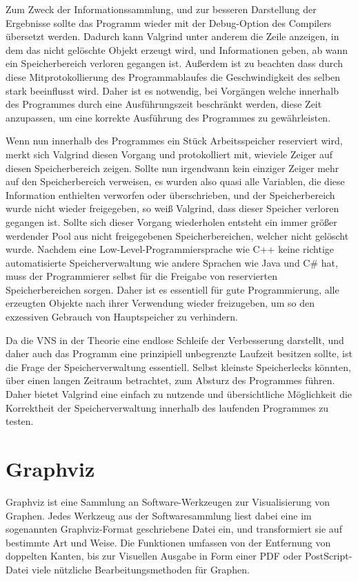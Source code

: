 Zum Zweck der Informationssammlung, und zur besseren Darstellung der Ergebnisse sollte das Programm wieder mit der Debug-Option des Compilers übersetzt werden. Dadurch kann Valgrind unter anderem die Zeile
anzeigen, in dem das nicht gelöschte Objekt erzeugt wird, und Informationen geben, ab wann ein Speicherbereich verloren gegangen ist. Außerdem ist zu beachten dass durch diese Mitprotokollierung des 
Programmablaufes die Geschwindigkeit des selben stark beeinflusst wird. Daher ist es notwendig, bei Vorgängen welche innerhalb des Programmes durch eine Ausführungszeit beschränkt werden, diese Zeit anzupassen, 
um eine korrekte Ausführung des Programmes zu gewährleisten. 

Wenn nun innerhalb des Programmes ein Stück Arbeitsspeicher reserviert wird, merkt sich Valgrind diesen Vorgang und protokolliert mit, wieviele Zeiger auf diesen Speicherbereich zeigen. Sollte nun irgendwann
kein einziger Zeiger mehr auf den Speicherbereich verweisen, es wurden also quasi alle Variablen, die diese Information enthielten verworfen oder überschrieben, und der Speicherbereich wurde nicht wieder
freigegeben, so weiß Valgrind, dass dieser Speicher verloren gegangen ist. Sollte sich dieser Vorgang wiederholen entsteht ein immer größer werdender Pool aus nicht freigegebenen Speicherbereichen, welcher
nicht gelöscht wurde. Nachdem eine Low-Level-Programmiersprache wie C++ keine richtige automatisierte Speicherverwaltung wie andere Sprachen wie Java und C\# hat, muss der Programmierer selbst für die 
Freigabe von reservierten Speicherbereichen sorgen. Daher ist es essentiell für gute Programmierung, alle erzeugten Objekte nach ihrer Verwendung wieder freizugeben, um so den exzessiven Gebrauch von
Hauptspeicher zu verhindern.

Da die VNS in der Theorie eine endlose Schleife der Verbesserung darstellt, und daher auch das Programm eine prinzipiell unbegrenzte Laufzeit besitzen sollte, ist die Frage der Speicherverwaltung essentiell.
Selbst kleinste Speicherlecks könnten, über einen langen Zeitraum betrachtet, zum Absturz des Programmes führen. Daher bietet Valgrind eine einfach zu nutzende und übersichtliche Möglichkeit die Korrektheit
der Speicherverwaltung innerhalb des laufenden Programmes zu testen. 

\section{Graphviz}
Graphviz ist eine Sammlung an Software-Werkzeugen zur Visualisierung von Graphen. Jedes Werkzeug aus der Softwaresammlung liest dabei eine im sogenannten Graphviz-Format ge\-schriebene Datei ein, und transformiert
sie auf bestimmte Art und Weise. Die Funktionen umfassen von der Entfernung von doppelten Kanten, bis zur Visuellen Ausgabe in Form einer PDF oder PostScript-Datei viele nützliche Bearbeitungsmethoden für 
Graphen. 

